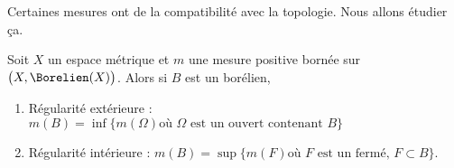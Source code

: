 Certaines mesures ont de la compatibilité avec la topologie. Nous allons étudier ça.

\begin{theorem}     \label{ThoPKGEooVrpsGU}
	Soit \( X\) un espace métrique et \( m\) une mesure positive bornée sur \( \big(X,\Borelien(X)\big)\). Alors si \( B\) est un borélien,
	\begin{enumerate}
		\item
		      Régularité extérieure : \( m(B)=\inf\{ m(\Omega)\text{où } \Omega\text{ est un ouvert contenant } B \}\)
		\item
		      Régularité intérieure : \( m(B)=\sup\{ m(F) \text{où } F\text{ est un fermé, } F\subset B \}\).
	\end{enumerate}
\end{theorem}

